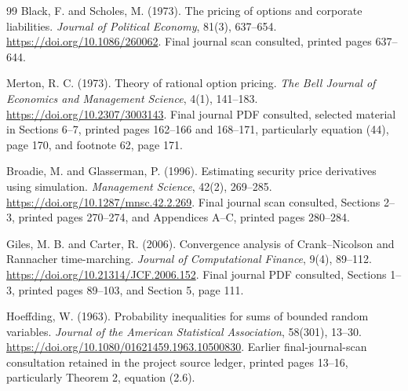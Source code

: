 \documentclass[11pt]{article}
\begin{document}
\begin{thebibliography}{99}
Black, F. and Scholes, M. (1973). The pricing of options and corporate liabilities. \emph{Journal of Political Economy}, 81(3), 637--654. \url{https://doi.org/10.1086/260062}. Final journal scan consulted, printed pages 637--644.

Merton, R. C. (1973). Theory of rational option pricing. \emph{The Bell Journal of Economics and Management Science}, 4(1), 141--183. \url{https://doi.org/10.2307/3003143}. Final journal PDF consulted, selected material in Sections 6--7, printed pages 162--166 and 168--171, particularly equation (44), page 170, and footnote 62, page 171.

Broadie, M. and Glasserman, P. (1996). Estimating security price derivatives using simulation. \emph{Management Science}, 42(2), 269--285. \url{https://doi.org/10.1287/mnsc.42.2.269}. Final journal scan consulted, Sections 2--3, printed pages 270--274, and Appendices A--C, printed pages 280--284.

Giles, M. B. and Carter, R. (2006). Convergence analysis of Crank--Nicolson and Rannacher time-marching. \emph{Journal of Computational Finance}, 9(4), 89--112. \url{https://doi.org/10.21314/JCF.2006.152}. Final journal PDF consulted, Sections 1--3, printed pages 89--103, and Section 5, page 111.

 Hoeffding, W. (1963). Probability inequalities for sums of bounded random variables. \emph{Journal of the American Statistical Association}, 58(301), 13--30. \url{https://doi.org/10.1080/01621459.1963.10500830}. Earlier final-journal-scan consultation retained in the project source ledger, printed pages 13--16, particularly Theorem 2, equation (2.6).

\end{thebibliography}
\end{document}
